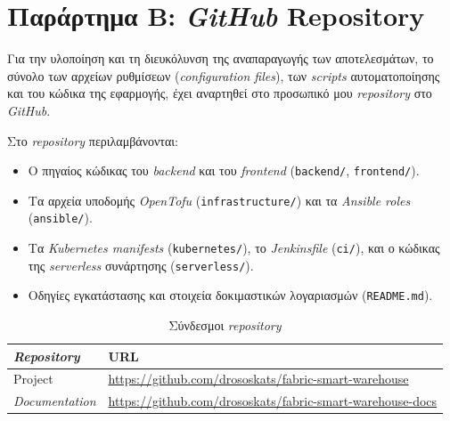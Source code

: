 \section*{Παράρτημα Β: \textit{GitHub} Repository}
Για την υλοποίηση και τη διευκόλυνση της αναπαραγωγής των αποτελεσμάτων, το σύνολο των αρχείων ρυθμίσεων (\textit{configuration files}), των \textit{scripts} αυτοματοποίησης και του κώδικα της εφαρμογής, έχει αναρτηθεί στο προσωπικό μου \textit{repository} στο \textit{GitHub}.

Στο \textit{repository} περιλαμβάνονται:
\begin{itemize}
    \item Ο πηγαίος κώδικας του \textit{backend} και του \textit{frontend} (\texttt{backend/}, \texttt{frontend/}).
    \item Τα αρχεία υποδομής \textit{OpenTofu} (\texttt{infrastructure/}) και τα \textit{Ansible roles} (\texttt{ansible/}).
    \item Τα \textit{Kubernetes manifests} (\texttt{kubernetes/}), το \textit{Jenkinsfile} (\texttt{ci/}), και ο κώδικας της \textit{serverless} συνάρτησης (\texttt{serverless/}).
    \item Οδηγίες εγκατάστασης και στοιχεία δοκιμαστικών λογαριασμών (\texttt{README.md}).
\end{itemize}

\begin{table}[htbp]
\centering
\renewcommand{\arraystretch}{1.5}
\caption{Σύνδεσμοι \textit{repository}}
\label{tab:repos}
\small
\begin{tabularx}{\textwidth}{| >{\centering\arraybackslash}p{3cm} | X |}
\hline
\rowcolor{HUAblue} 
\textbf{\color{white} \textit{Repository}} & \textbf{\color{white} URL} \\ \hline

Project & \url{https://github.com/drososkats/fabric-smart-warehouse} \\ \hline

\rowcolor{lightgray!30}
\textit{Documentation} & \url{https://github.com/drososkats/fabric-smart-warehouse-docs} \\ \hline
\end{tabularx}
\end{table}